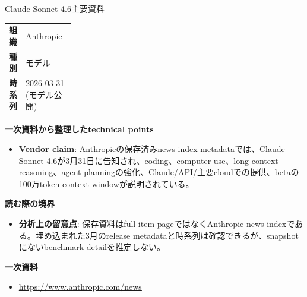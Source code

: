 \begin{technicalnote}{Claude Sonnet 4.6}{主要資料}
\begingroup
\begin{tabularx}{\linewidth}{@{}>{\bfseries}p{0.22\linewidth}X@{}}
組織 & Anthropic \\
種別 & モデル \\
時系列 & 2026-03-31 (モデル公開) \\
\end{tabularx}
\smallskip
{\bfseries 一次資料から整理したtechnical points}
\begin{itemize}[leftmargin=1.5em,itemsep=0.35em]
\item \textbf{Vendor claim}: Anthropicの保存済みnews-index metadataでは、Claude Sonnet 4.6が3月31日に告知され、coding、computer use、long-context reasoning、agent planningの強化、Claude/API/主要cloudでの提供、betaの100万token context windowが説明されている。
\end{itemize}
\begin{minipage}{\linewidth}
{\bfseries 読む際の境界}
\begin{itemize}[leftmargin=1.5em,itemsep=0.35em]
\item \textbf{分析上の留意点}: 保存資料はfull item pageではなくAnthropic news indexである。埋め込まれた3月のrelease metadataと時系列は確認できるが、snapshotにないbenchmark detailを推定しない。
\end{itemize}
\begin{samepage}
{\bfseries 一次資料}
\begingroup\sloppy
\begin{itemize}[leftmargin=1.5em,itemsep=0.25em]
\item {\scriptsize\url{https://www.anthropic.com/news}}
\end{itemize}
\endgroup
\end{samepage}
\end{minipage}
\endgroup
\end{technicalnote}
\medskip

